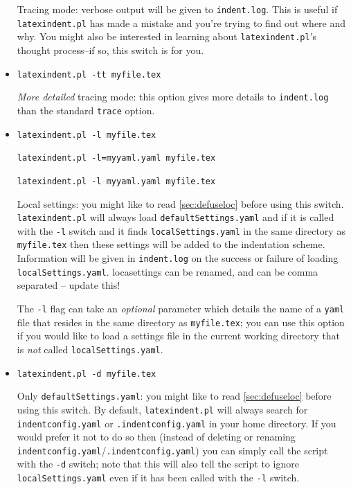 \documentclass[11pt]{article}
\newcommand{\verbitem}[1]{\small\PVerb{#1}}
\begin{document}
\begin{itemize}[labelsep=.25cm]
	      \label{page:traceswitch}
	      Tracing mode: verbose output will be given to \lstinline!indent.log!. This
	      is useful if \lstinline!latexindent.pl! has made a mistake and you're
	      trying to find out where and why. You might also be interested in learning
	      about \lstinline!latexindent.pl!'s thought process--if so, this
	      switch is for you.
	\item[\verbitem{-tt, --ttrace}] \lstinline!latexindent.pl -tt myfile.tex!

      \emph{More detailed} tracing mode: this option gives more details to \lstinline!indent.log!
      than the standard \lstinline!trace! option.
	\item[\verbitem{-l, --local[=myyaml.yaml]}] \lstinline!latexindent.pl -l myfile.tex!

\lstinline!latexindent.pl -l=myyaml.yaml myfile.tex!

\lstinline!latexindent.pl -l myyaml.yaml myfile.tex!


	      \label{page:localswitch}
	      Local settings: you might like to read \cref{sec:defuseloc} before
	      using this switch. \lstinline!latexindent.pl! will always load \lstinline!defaultSettings.yaml!
	      and if it is called with the \lstinline!-l! switch and it finds \lstinline!localSettings.yaml!
	      in the same directory as \lstinline!myfile.tex! then these settings will be
	      added to the indentation scheme. Information will be given in \lstinline!indent.log! on
	      the success or failure of loading \lstinline!localSettings.yaml!.
          {\huge locasettings can be renamed, and can be comma separated -- update this!}

The \lstinline!-l! flag can take an \emph{optional} parameter which details the name of a \lstinline!yaml! file
that resides in the same directory as \lstinline!myfile.tex!; you can use this option if you would 
like to load a settings file in the current working directory that is \emph{not} called \lstinline!localSettings.yaml!.

	\item[\verbitem{-d, --onlydefault}] \lstinline!latexindent.pl -d myfile.tex!

	      Only \lstinline!defaultSettings.yaml!: you might like to read \cref{sec:defuseloc} before
	      using this switch. By default, \lstinline!latexindent.pl! will always search for
	      \lstinline!indentconfig.yaml! or \lstinline!.indentconfig.yaml!  in your home directory. If you would prefer it not to do so
	      then (instead of deleting or renaming \lstinline!indentconfig.yaml!/\lstinline!.indentconfig.yaml!) you can simply
	      call the script with the \lstinline!-d! switch; note that this will also tell
	      the script to ignore \lstinline!localSettings.yaml! even if it has been called with the
	      \lstinline!-l! switch.


\end{itemize}
\end{document}
